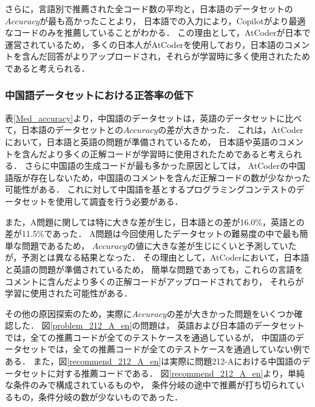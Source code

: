   さらに，言語別で推薦された全コード数の平均と，日本語のデータセットの$Accuracy$が最も高かったことより，
  日本語での入力により，Copilotがより最適なコードのみを推薦していることがわかる．
  この理由として，AtCoder\cite{AtCoder}が日本で運営されているため，
  多くの日本人がAtCoderを使用しており，日本語のコメントを含んだ回答がよりアップロードされ，それらが学習時に多く使用されたためであると考えられる．
  \subsubsection{中国語データセットにおける正答率の低下}
  表\ref{Med_accuracy}より，中国語のデータセットは，英語のデータセットに比べて，日本語のデータセットとの$Accuracy$の差が大きかった．
  これは，AtCoder\cite{AtCoder}において，日本語と英語の問題が準備されているため，
  日本語や英語のコメントを含んだより多くの正解コードが学習時に使用されたためであると考えられる．
  さらに中国語の生成コードが最も多かった原因としては，
  AtCoderの中国語版が存在しないため，中国語のコメントを含んだ正解コードの数が少なかった可能性がある．
  これに対して中国語を基とするプログラミングコンテストのデータセットを使用して調査を行う必要がある．
  
  また，A問題に関しては特に大きな差が生じ，日本語との差が16.0\%，英語との差が11.5\%であった．
  A問題は今回使用したデータセットの難易度の中で最も簡単な問題であるため，
  $Accuracy$の値に大きな差が生じにくいと予測していたが，予測とは異なる結果となった．
  その理由として，AtCoder\cite{AtCoder}において，日本語と英語の問題が準備されているため，
  簡単な問題であっても，これらの言語をコメントに含んだより多くの正解コードがアップロードされており，
  それらが学習に使用された可能性がある．

  その他の原因探索のため，実際に$Accuracy$の差が大きかった問題をいくつか確認した．
  図\ref{problem_212_A_en}の問題は，
  英語および日本語のデータセットでは，全ての推薦コードが全てのテストケースを通過しているが，
  中国語のデータセットでは，全ての推薦コードが全てのテストケースを通過していない例である．
  また，図\ref{recommend_212_A_en}は実際に問題212-Aにおける中国語のデータセットに対する推薦コードである．
  図\ref{recommend_212_A_en}より，単純な条件のみで構成されているものや，
  条件分岐の途中で推薦が打ち切られているもの，条件分岐の数が少ないものであった．
  
